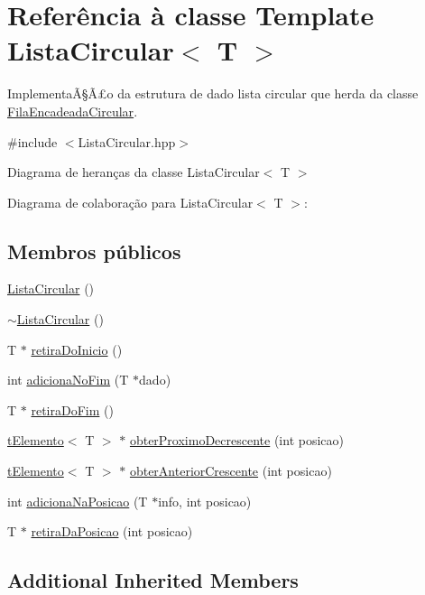 \hypertarget{a00004}{\section{Referência à classe Template Lista\+Circular$<$ T $>$}
\label{a00004}
}


ImplementaÃ§Ã£o da estrutura de dado lista circular que herda da classe \hyperlink{a00003}{Fila\+Encadeada\+Circular}.  




{\ttfamily \#include $<$Lista\+Circular.\+hpp$>$}



Diagrama de heranças da classe Lista\+Circular$<$ T $>$


Diagrama de colaboração para Lista\+Circular$<$ T $>$\+:
\subsection*{Membros públicos}
\begin{DoxyCompactItemize}
\item 
\hyperlink{a00004_a257dc7d8b78f8312ac821ba437d9ab77}{Lista\+Circular} ()
\item 
\hyperlink{a00004_a17151a2a3416edbcdb8d095e64068c05}{$\sim$\+Lista\+Circular} ()
\item 
T $\ast$ \hyperlink{a00004_ae60601f89f078c8e456e6cd27188ea6d}{retira\+Do\+Inicio} ()
\item 
int \hyperlink{a00004_affd9b0cb331519a4386dc172708a4729}{adiciona\+No\+Fim} (T $\ast$dado)
\item 
T $\ast$ \hyperlink{a00004_a5314f5fcd36f0a7bc3f140971737b66a}{retira\+Do\+Fim} ()
\item 
\hyperlink{a00006}{t\+Elemento}$<$ T $>$ $\ast$ \hyperlink{a00004_abfe109e00fc3bb438a26335586c2e0cb}{obter\+Proximo\+Decrescente} (int posicao)
\item 
\hyperlink{a00006}{t\+Elemento}$<$ T $>$ $\ast$ \hyperlink{a00004_a3eb9602a4d4585f2b5d8bca3dd66146d}{obter\+Anterior\+Crescente} (int posicao)
\item 
int \hyperlink{a00004_a8fdef408a651dd0e86ef251ffe58e074}{adiciona\+Na\+Posicao} (T $\ast$info, int posicao)
\item 
T $\ast$ \hyperlink{a00004_ae310f8ef47da383064c3921bdc50f1c6}{retira\+Da\+Posicao} (int posicao)
\end{DoxyCompactItemize}
\subsection*{Additional Inherited Members}


